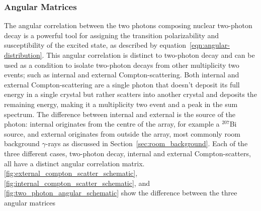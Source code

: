 \documentclass[cnatzke_thesis_proposal.tex]{subfiles}
\begin{document}
\subsubsection{Angular Matrices}

The angular correlation between the two photons composing nuclear two-photon decay is a powerful tool for assigning the transition polarizability and susceptibility of the excited state, as described by equation~\ref{eqn:angular-distribution}.
This angular correlation is distinct to two-photon decay and can be used as a condition to isolate two-photon decays from other multiplicity two events; such as internal and external Compton-scattering.
Both internal and external Compton-scattering are a single photon that doesn't deposit its full energy in a single crystal but rather scatters into another crystal and deposits the remaining energy, making it a multiplicity two event and a peak in the sum spectrum. 
The difference between internal and external is the source of the photon: internal originates from the centre of the array, for example a $^{207}$Bi source, and external originates from outside the array, most commonly room background $\gamma$-rays as discussed in Section~\ref{sec:room_background}.
Each of the three different cases, two-photon decay, internal and external Compton-scatters, all have a distinct angular correlation matrix. 
\ref{fig:external_compton_scatter_schematic}, \ref{fig:internal_compton_scatter_schematic}, and \ref{fig:two_photon_angular_schematic} show the difference between the three angular matrices
\end{document}
